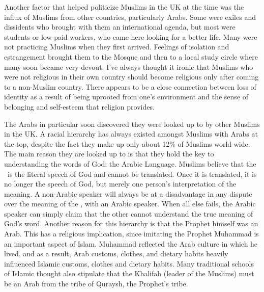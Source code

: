 \documentclass[12pt]{memoir}
\begin{document}
Another factor that helped politicize Muslims in the UK at the time
was the influx of Muslims from other countries, particularly Arabs.
Some were exiles and dissidents who brought with them an international agenda,
but most were students or low-paid workers,
who came here looking for a better life.
Many were not practicing Muslims when they first arrived.
Feelings of isolation and estrangement brought them to the Mosque
and then to a local study circle where many soon became very devout.
I’ve always thought it ironic that Muslims
who were not religious in their own country
should become religious only after coming to a non-Muslim country.
There appears to be a close connection between loss of identity
as a result of being uprooted from one’s environment
and the sense of belonging and self-esteem that religion provides.

The Arabs in particular soon discovered
they were looked up to by other Muslims in the UK.
A racial hierarchy has always existed amongst Muslims with Arabs at the top,
despite the fact they make up only about 12\% of Muslims world-wide.
The main reason they are looked up to is that they hold the key
to understanding the words of God: the Arabic Language.
Muslims believe that the \Quran\ is the literal speech of God
and cannot be translated.
Once it is translated, it is no longer the speech of God,
but merely one person’s interpretation of the meaning.
A non-Arabic speaker will always be at a disadvantage in any dispute
over the meaning of the \Quran, with an Arabic speaker.
When all else fails, the Arabic speaker can simply claim
that the other cannot understand the true meaning of God’s word.
Another reason for this hierarchy is that the Prophet himself was an Arab.
This has a religious implication,
since imitating the Prophet Muhammad is an important aspect of Islam.
Muhammad reflected the Arab culture in which he lived, and as a result,
Arab customs, clothes, and dietary habits heavily influenced Islamic customs,
clothes and dietary habits.
Many traditional schools of Islamic thought also stipulate
that the Khalifah (leader of the Muslims)
must be an Arab from the tribe of Quraysh, the Prophet’s tribe.
\end{document}

